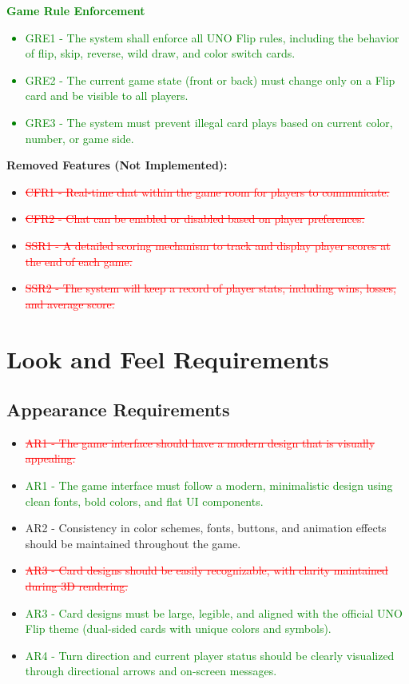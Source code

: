 \documentclass[12pt]{article}
\newcommand{\removed}[1]{\textcolor{red}{\sout{#1}}}
\newcommand{\added}[1]{\textcolor{green}{#1}}
\begin{document}
\added{\textbf{Game Rule Enforcement}
\begin{itemize}
    \item GRE1 - The system shall enforce all UNO Flip rules, including the behavior of flip, skip, reverse, wild draw, and color switch cards.
    \item GRE2 - The current game state (front or back) must change only on a Flip card and be visible to all players.
    \item GRE3 - The system must prevent illegal card plays based on current color, number, or game side.
\end{itemize}}

\textbf{Removed Features (Not Implemented):}
\begin{itemize}
    \item \removed{CFR1 - Real-time chat within the game room for players to communicate.}
    \item \removed{CFR2 - Chat can be enabled or disabled based on player preferences.}
    \item \removed{SSR1 - A detailed scoring mechanism to track and display player scores at the end of each game.}
    \item \removed{SSR2 - The system will keep a record of player stats, including wins, losses, and average score.}
\end{itemize}

\section{Look and Feel Requirements}

\subsection{Appearance Requirements}
\begin{itemize}
    \item \removed{AR1 - The game interface should have a modern design that is visually appealing.}
    \item \added{AR1 - The game interface must follow a modern, minimalistic design using clean fonts, bold colors, and flat UI components.}
    \item AR2 - Consistency in color schemes, fonts, buttons, and animation effects should be maintained throughout the game.
    \item \removed{AR3 - Card designs should be easily recognizable, with clarity maintained during 3D rendering.}
    \item \added{AR3 - Card designs must be large, legible, and aligned with the official UNO Flip theme (dual-sided cards with unique colors and symbols).}
    \item \added{AR4 - Turn direction and current player status should be clearly visualized through directional arrows and on-screen messages.}
\end{itemize}
\end{document}
